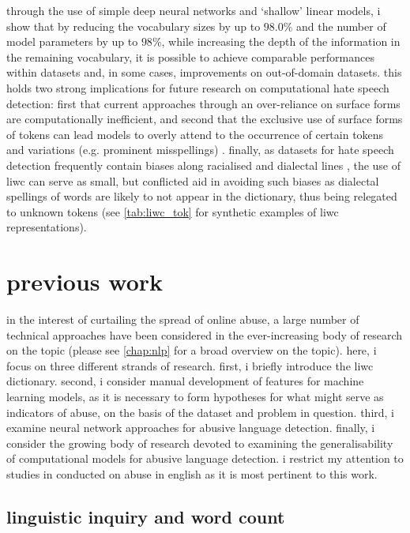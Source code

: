 through the use of simple deep neural networks and `shallow' linear models, i show that by reducing the vocabulary sizes by up to $98.0\%$ and the number of model parameters by up to $98\%$, while increasing the depth of the information in the remaining vocabulary, it is possible to achieve comparable performances within datasets and, in some cases, improvements on out-of-domain datasets. 
this holds two strong implications for future research on computational hate speech detection: first that current approaches through an over-reliance on surface forms are computationally inefficient, and second that the exclusive use of surface forms of tokens can lead models to overly attend to the occurrence of certain tokens and variations (e.g. prominent misspellings) \citep{rottger:2021}.
finally, as datasets for hate speech detection frequently contain biases along racialised and dialectal lines \citep{waseem:2018,davidson:2019}, the use of liwc can serve as small, but conflicted aid in avoiding such biases as dialectal spellings of words are likely to not appear in the dictionary, thus being relegated to unknown tokens (see \cref{tab:liwc_tok} for synthetic examples of liwc representations).

\section{previous work}

in the interest of curtailing the spread of online abuse, a large number of technical approaches have been considered in the ever-increasing body of research on the topic (please see \cref{chap:nlp} for a broad overview on the topic).
here, i focus on three different strands of research. 
first, i briefly introduce the liwc dictionary. 
second, i consider manual development of features for machine learning models, as it is necessary to form hypotheses for what might serve as indicators of abuse, on the basis of the dataset and problem in question.
third, i examine neural network approaches for abusive language detection.
finally, i consider the growing body of research devoted to examining the generalisability of computational models for abusive language detection. 
i restrict my attention to studies in conducted on abuse in english as it is most pertinent to this work.

\subsection{linguistic inquiry and word count}

